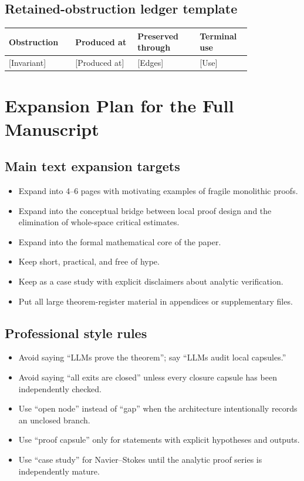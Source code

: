 \documentclass[11pt]{article}
\theoremstyle{plain}
\theoremstyle{definition}
\theoremstyle{remark}
\newcommand{\NS}{Navier--Stokes}
\begin{document}
\subsection{Retained-obstruction ledger template}
\begin{center}
\begin{longtable}{p{0.22\linewidth}p{0.22\linewidth}p{0.22\linewidth}p{0.16\linewidth}}
\toprule
Obstruction & Produced at & Preserved through & Terminal use \\
\midrule
{[Invariant]} & {[Produced at]} & {[Edges]} & {[Use]} \\
\bottomrule
\end{longtable}
\end{center}

\section{Expansion Plan for the Full Manuscript}
\label{app:expansion-plan}

\subsection{Main text expansion targets}
\begin{itemize}
  \item Expand  into 4--6 pages with motivating examples of fragile monolithic proofs.
  \item Expand  into the conceptual bridge between local proof design and the elimination of whole-space critical estimates.
  \item Expand  into the formal mathematical core of the paper.
  \item Keep  short, practical, and free of hype.
  \item Keep  as a case study with explicit disclaimers about analytic verification.
  \item Put all large theorem-register material in appendices or supplementary files.
\end{itemize}

\subsection{Professional style rules}
\begin{itemize}
  \item Avoid saying ``LLMs prove the theorem''; say ``LLMs audit local capsules.''
  \item Avoid saying ``all exits are closed'' unless every closure capsule has been independently checked.
  \item Use ``open node'' instead of ``gap'' when the architecture intentionally records an unclosed branch.
  \item Use ``proof capsule'' only for statements with explicit hypotheses and outputs.
  \item Use ``case study'' for \NS{} until the analytic proof series is independently mature.
\end{itemize}
\end{document}
